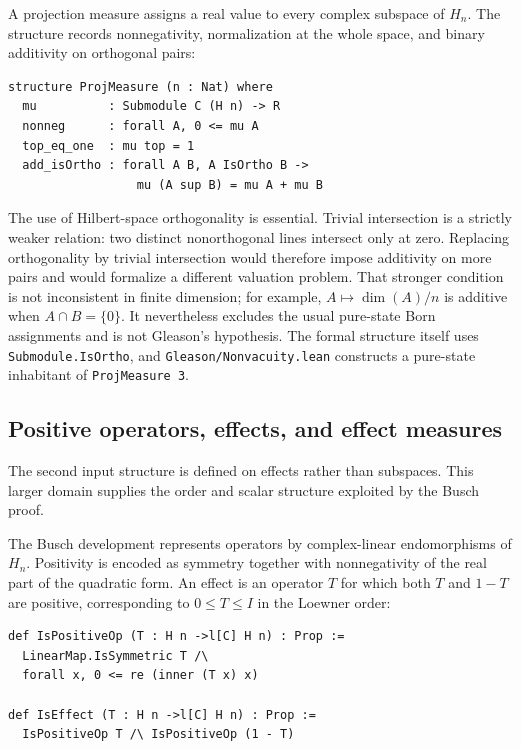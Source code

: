 \documentclass[pdflatex,sn-mathphys-num]{sn-jnl}
\providecommand{\passthrough}[1]{#1}
\theoremstyle{thmstyleone}
\theoremstyle{thmstylethree}
\begin{document}
A projection measure assigns a real value to every complex subspace of \(H_n\). The structure records nonnegativity, normalization at the whole space, and binary additivity on orthogonal pairs:

\begin{lstlisting}
structure ProjMeasure (n : Nat) where
  mu          : Submodule C (H n) -> R
  nonneg      : forall A, 0 <= mu A
  top_eq_one  : mu top = 1
  add_isOrtho : forall A B, A IsOrtho B ->
                  mu (A sup B) = mu A + mu B
\end{lstlisting}

The use of Hilbert-space orthogonality is essential. Trivial intersection is a strictly weaker relation: two distinct nonorthogonal lines intersect only at zero. Replacing orthogonality by trivial intersection would therefore impose additivity on more pairs and would formalize a different valuation problem. That stronger condition is not inconsistent in finite dimension; for example, \(A\mapsto \dim(A)/n\) is additive when \(A\cap B=\{0\}\). It nevertheless excludes the usual pure-state Born assignments and is not Gleason's hypothesis. The formal structure itself uses \passthrough{\lstinline!Submodule.IsOrtho!}, and \passthrough{\lstinline!Gleason/Nonvacuity.lean!} constructs a pure-state inhabitant of \passthrough{\lstinline!ProjMeasure 3!}.

\subsection{Positive operators, effects, and effect measures}\label{positive-operators-effects-and-effect-measures}

The second input structure is defined on effects rather than subspaces. This larger domain supplies the order and scalar structure exploited by the Busch proof.

The Busch development represents operators by complex-linear endomorphisms of \(H_n\). Positivity is encoded as symmetry together with nonnegativity of the real part of the quadratic form. An effect is an operator \(T\) for which both \(T\) and \(1-T\) are positive, corresponding to \(0\leq T\leq I\) in the Loewner order:

\begin{lstlisting}
def IsPositiveOp (T : H n ->l[C] H n) : Prop :=
  LinearMap.IsSymmetric T /\
  forall x, 0 <= re (inner (T x) x)

def IsEffect (T : H n ->l[C] H n) : Prop :=
  IsPositiveOp T /\ IsPositiveOp (1 - T)
\end{lstlisting}
\end{document}

